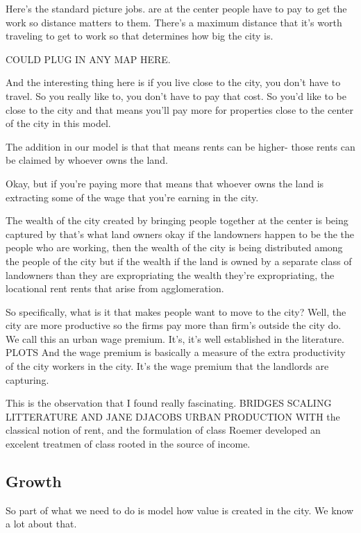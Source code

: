 Here's the standard picture jobs. are at the center people have to pay to get the work so distance matters to them. There's a maximum distance that it's worth traveling to get to work so that determines how big the city is.

COULD PLUG IN ANY MAP HERE. 

And the  interesting thing here is if you live close to the city, you don't have to travel. So you really like to, you don't have to pay that cost. So you'd like to be close to the city and that means you'll pay more for properties close to the center of the city in this model.

The addition in our model is that that means rents can be higher- those rents can be claimed by whoever owns the land.

Okay, but if you're paying more that means that whoever owns the land is extracting some of the wage that you're earning in the city.

The wealth of the city created by bringing people together at the center is being captured by that's what land owners okay if the landowners happen to be the the people who are working, then the wealth of the city is being distributed among the people of the city but if the wealth if the land is owned by a separate class of landowners than they are expropriating the wealth they're expropriating, the locational rent rents that arise from agglomeration.

So specifically, what is it that makes people want to move to the city? Well, the city are more productive so the firms pay more than  firm's outside the city do.  We call this an urban wage premium. It's, it's well established in the literature. PLOTS
And the wage premium is basically a measure of the extra productivity of the city workers in the city.
It's the wage premium that the landlords are capturing. 


This is the observation that I found really fascinating. 
BRIDGES SCALING LITTERATURE AND JANE DJACOBS URBAN PRODUCTION WITH the classical notion of rent, and the formulation of class Roemer developed an excelent treatmen of class rooted in the source of income. 



\subsection{Growth}
So part of what we need to do is model how value is created in the city. 
We know a lot about that. 

